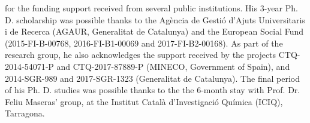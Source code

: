 
 for the funding support received from several public institutions. His 3-year Ph. D. scholarship was possible thanks to the Agència de Gestió d'Ajuts Universitaris i de Recerca (AGAUR, Generalitat de Catalunya) and the European Social Fund (2015-FI-B-00768, 2016-FI-B1-00069 and 2017-FI-B2-00168). As part of the research group, he also acknowledges the support received by the projects CTQ-2014‐54071‐P and CTQ-2017-87889-P (MINECO, Government of Spain), and 2014-SGR-989 and 2017-SGR-1323 (Generalitat de Catalunya). The final period of his Ph. D. studies was possible thanks to the the 6-month stay with Prof. Dr. Feliu Maseras' group, at the Institut Català d'Investigació Química (ICIQ), Tarragona.
